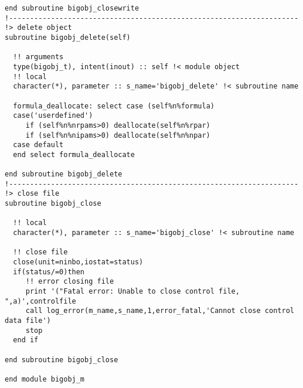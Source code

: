 \begin{verbatim}
end subroutine bigobj_closewrite
!---------------------------------------------------------------------
!> delete object
subroutine bigobj_delete(self)

  !! arguments
  type(bigobj_t), intent(inout) :: self !< module object
  !! local
  character(*), parameter :: s_name='bigobj_delete' !< subroutine name

  formula_deallocate: select case (self%n%formula)
  case('userdefined')
     if (self%n%nrpams>0) deallocate(self%n%rpar)
     if (self%n%nipams>0) deallocate(self%n%npar)
  case default
  end select formula_deallocate

end subroutine bigobj_delete
!---------------------------------------------------------------------
!> close file
subroutine bigobj_close

  !! local
  character(*), parameter :: s_name='bigobj_close' !< subroutine name

  !! close file
  close(unit=ninbo,iostat=status)
  if(status/=0)then
     !! error closing file
     print '("Fatal error: Unable to close control file, ",a)',controlfile
     call log_error(m_name,s_name,1,error_fatal,'Cannot close control data file')
     stop
  end if

end subroutine bigobj_close

end module bigobj_m
\end{verbatim}
\normalsize
